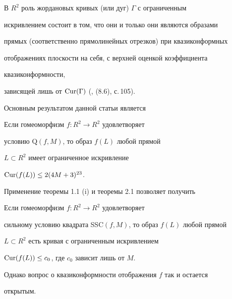 В $R^2$ роль жордановых кривых (или дуг) $\Gamma$ с ограниченным 


искривлением состоит в том, что они и только они являются образами 


прямых (соответственно прямолинейных отрезков) при квазиконформных 


отображениях плоскости на себя, с верхней оценкой коэффициента 


квазиконформности, 


зависящей лишь от $\operatorname{Cur}(\Gamma)$ (\cite{LV}, (8.6), с.\,105). 





Основным результатом данной статьи является





\begin{thms}


Если гомеоморфизм $f:R^2 \to R^2$ удовлетворяет 


условию $\mathrm Q(f, M)$, то образ $f(L)$ любой прямой 


$L \subset R^2$ имеет ограниченное искривление 


$\operatorname{Cur}(f(L)) \leq 2(4M+3)^{23}$.


\end{thms}





Применение теоремы 1.1 (i) и теоремы 2.1 позволяет получить





\begin{cors}


Если гомеоморфизм $f: R^2 \to R^2$ удовлетворяет 


сильному условию квадрата SSC$(f,M)$, то образ $f(L)$ любой прямой 


$L\subset R^2$ есть кривая с ограниченным искривлением 


$\operatorname{Cur}(f(L))\leq c_0$, где $c_0$ зависит лишь от $M$.


\end{cors}





Однако вопрос о квазиконформности отображения $f$ так и остается 


открытым. 








